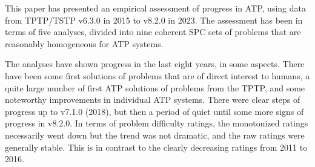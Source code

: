 \documentclass[runningheads]{llncs}
\begin{document}
This paper has presented an empirical assessment of progress in ATP, using data from TPTP/TSTP
v6.3.0 in 2015 to v8.2.0 in 2023.
The assessment has been in terms of five analyses, divided into nine coherent SPC sets of problems
that are reasonably homogeneous for ATP systems.

The analyses have shown progress in the last eight years, in some aspects. 
There have been some first solutions of problems that are of direct interest to humans, 
a quite large number of first ATP solutions of problems from the TPTP, and 
some noteworthy improvements in individual ATP systems.
There were clear steps of progress up to v7.1.0 (2018), but then a period of quiet until some
more signs of progress in v8.2.0.
In terms of problem difficulty ratings, the monotonized ratings necessarily went down but the 
trend was not dramatic, and the raw ratings were generally stable.
This is in contrast to the clearly decreasing ratings from 2011 to 2016.
\end{document}
